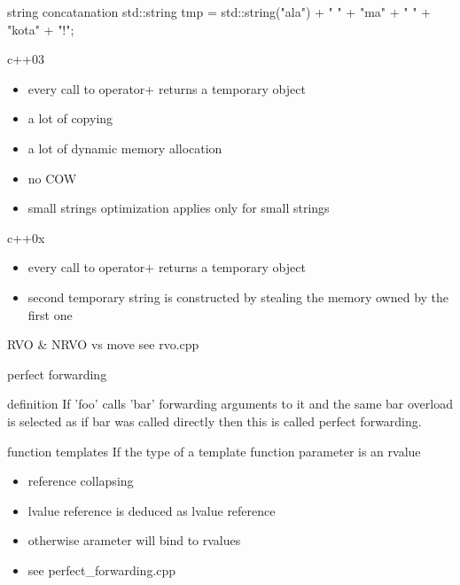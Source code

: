 \documentclass{beamer}
\begin{document}
\begin{frame}{string concatanation}
  std::string tmp = std::string("ala") + " " + "ma" + " " + "kota" + "!";
  \begin{block}{c++03}
    \begin{itemize}
    \item every call to operator+ returns a temporary object
    \item a lot of copying
    \item a lot of dynamic memory allocation
    \item no COW
    \item small strings optimization applies only for small strings
    \end{itemize}
  \end{block}

  \begin{block}{c++0x}
    \begin{itemize}
    \item every call to operator+ returns a temporary object
    \item second temporary string is constructed by stealing the memory owned by the first one
    \end{itemize}
  \end{block}
\end{frame}

\begin{frame}{RVO & NRVO vs move}
  see rvo.cpp
\end{frame}

\begin{frame}{perfect forwarding}
  \begin{block}{definition}
    If 'foo' calls 'bar' forwarding arguments to it and the same bar
    overload is selected as if bar was called directly then this is
    called perfect forwarding.
  \end{block}
  \begin{block}{function templates}
    If the type of a template function parameter is an rvalue
    \begin{itemize}
    \item reference collapsing
    \item lvalue reference is deduced as lvalue reference
    \item otherwise arameter will bind to rvalues
    \item see perfect\_forwarding.cpp
    \end{itemize}
  \end{block}
\end{frame}
\end{document}
